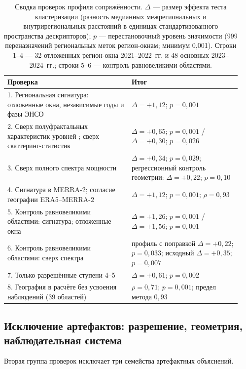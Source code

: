 \documentclass[11pt,a4paper]{article}
\begin{document}
\begin{table}[H]
\centering
\caption{Сводка проверок профиля сопряжённости. $\Delta$ --- размер эффекта теста кластеризации (разность медианных межрегиональных и внутрирегиональных расстояний в единицах стандартизованного пространства дескрипторов); $p$ --- перестановочный уровень значимости (999 переназначений региональных меток регион-окнам; минимум 0,001). Строки 1--4 --- 32 отложенных регион-окна 2021--2022~гг. и 48 основных 2023--2024~гг.; строки 5--6 --- контроль равновеликими областями.}
\label{tab:tests}
\small
\begin{tabular}{@{}p{0.50\linewidth}p{0.44\linewidth}@{}}
\toprule
Проверка & Итог\\
\midrule
1. Региональная сигнатура: отложенные окна, независимые годы и фазы ЭНСО & $\Delta=+1{,}12$; $p=0{,}001$\\
2. Сверх полуфрактальных характеристик уровней \cite{Krenke2019}; сверх скаттеринг-статистик \cite{Cheng2024} & $\Delta=+0{,}65$; $p=0{,}001$ / $\Delta=+0{,}30$; $p=0{,}026$\\
3. Сверх полного спектра мощности & $\Delta=+0{,}34$; $p=0{,}029$; регрессионный контроль геометрии: $\Delta=+0{,}22$; $p=0{,}10$\\
4. Сигнатура в MERRA-2; согласие географии ERA5--MERRA-2 & $\Delta=+1{,}12$; $p=0{,}001$; $\rho=0{,}93$\\
5. Контроль равновеликими областями: сигнатура; отложенные окна & $\Delta=+1{,}26$; $p=0{,}001$ / $\Delta=+1{,}56$; $p=0{,}001$\\
6. Контроль равновеликими областями: сверх спектра & профиль с поправкой $\Delta=+0{,}22$; $p=0{,}033$; исходный $\Delta=+0{,}35$; $p=0{,}007$\\
7. Только разрешённые ступени 4--5 & $\Delta=+0{,}61$; $p=0{,}002$\\
8. География в расчёте без усвоения наблюдений (39 областей) & $\rho=0{,}71$; $p=0{,}001$; предел метода $0{,}93$\\
\bottomrule
\end{tabular}
\end{table}

\subsection{Исключение артефактов: разрешение, геометрия, наблюдательная система}
\label{sec:artifacts}

Вторая группа проверок исключает три семейства артефактных объяснений.
\end{document}
